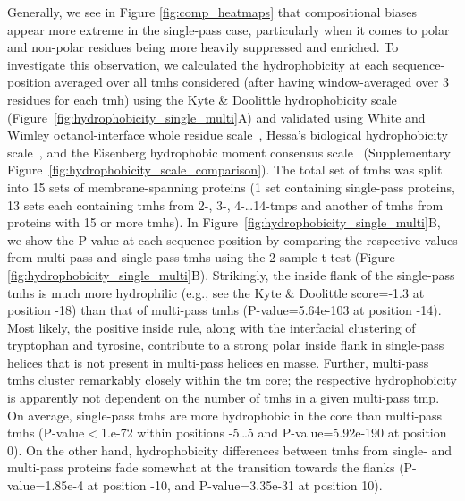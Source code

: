 Generally, we see in Figure \ref{fig:comp_heatmaps} that compositional biases appear more extreme in the single-pass case, particularly when it comes to polar and non-polar residues being more heavily suppressed and enriched.
To investigate this observation, we calculated the hydrophobicity at each sequence-position averaged over all \gls{tmh}s considered (after having window-averaged over 3 residues for each \gls{tmh}) using the Kyte \& Doolittle hydrophobicity scale~\cite{Kyte1982} (Figure~\ref{fig:hydrophobicity_single_multi}A) and validated using White and Wimley octanol-interface whole residue scale~\cite{White1999}, Hessa’s biological hydrophobicity scale~\cite{Hessa2005}, and the Eisenberg hydrophobic moment consensus scale~\cite{Eisenberg1984} (Supplementary Figure~\ref{fig:hydrophobicity_scale_comparison}).
The total set of \gls{tmh}s was split into 15 sets of membrane-spanning proteins (1 set containing single-pass proteins, 13 sets each containing \gls{tmh}s from 2-, 3-, 4-\ldots 14-\gls{tmp}s and another of \gls{tmh}s from proteins with 15 or more \gls{tmh}s).
In Figure~\ref{fig:hydrophobicity_single_multi}B, we show the P-value at each sequence position by comparing the respective values from multi-pass and single-pass \gls{tmh}s using the 2-sample t-test (Figure \ref{fig:hydrophobicity_single_multi}B).
Strikingly, the inside flank of the single-pass \gls{tmh}s is much more hydrophilic (e.g., see the Kyte \& Doolittle score=-1.3 at position -18) than that of multi-pass \gls{tmh}s (P-value=5.64e-103 at position -14).
Most likely, the positive inside rule, along with the interfacial clustering of tryptophan and tyrosine, contribute to a strong polar inside flank in single-pass helices that is not present in multi-pass helices en masse.
Further, multi-pass \gls{tmh}s cluster remarkably closely within the \gls{tm} core; the respective hydrophobicity is apparently not dependent on the number of \gls{tmh}s in a given multi-pass \gls{tmp}.
On average, single-pass \gls{tmh}s are more hydrophobic in the core than multi-pass \gls{tmh}s (P-value$<$1.e-72 within positions -5…5 and P-value=5.92e-190 at position 0).
On the other hand, hydrophobicity differences between \gls{tmh}s from single- and multi-pass proteins fade somewhat at the transition towards the flanks (P-value=1.85e-4 at position -10, and P-value=3.35e-31 at position 10).

